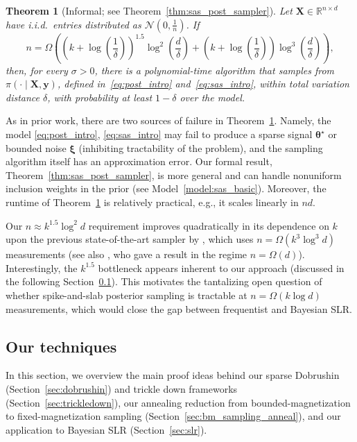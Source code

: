 \documentclass[11pt]{article}
\newtheorem{theorem}{Theorem}
\newcommand{\R}{\mathbb{R}}
\newcommand{\1}{\mathbf{1}}
\newcommand{\0}{\mathbf{0}}
\newcommand{\Par}[1]{\left(#1\right)}
\newcommand{\vth}{\boldsymbol{\theta}}
\newcommand{\vxi}{\boldsymbol{\xi}}
\newcommand{\sig}{\sigma}
\newcommand{\vths}{\vth^\star}
\newcommand{\mx}{{\mathbf{X}}}
\newcommand{\vy}{{\mathbf{y}}}
\newcommand{\calN}{{\mathcal{N}}}
\begin{document}
\begin{theorem}[Informal; see Theorem~\ref{thm:sas_post_sampler}]\label{thm:informal-slr}
Let $\mx\in\R^{n\times d}$ have i.i.d.\ entries distributed as
$\calN(0,\tfrac{1}{n})$. If
\begin{equation*}
    n
    =
    \Omega\left(
        \Par{k + \log\Par{\frac 1 \delta}}^{1.5}
        \log^2\left(\frac{d}{\delta}\right)
        +
        \Par{k + \log\Par{\frac 1 \delta}}
        \log^3\left(\frac{d}{\delta}\right)
    \right),
\end{equation*}
then, for every $\sig>0$, there is a polynomial-time algorithm that samples
from $\pi(\cdot\mid\mx,\vy)$, defined in~\eqref{eq:post_intro}
and~\eqref{eq:sas_intro}, within total variation distance $\delta$, with
probability at least $1-\delta$ over the model.
\end{theorem}
As in prior work, there are two sources of failure in Theorem~\ref{thm:informal-slr}. Namely, the model \eqref{eq:post_intro}, \eqref{eq:sas_intro} may fail to produce a sparse signal $\vths$ or bounded noise $\vxi$ (inhibiting tractability of the problem), and the sampling algorithm itself has an approximation error. Our formal result, Theorem~\ref{thm:sas_post_sampler}, is more general and can handle nonuniform inclusion weights in the prior (see Model~\ref{model:sas_basic}). Moreover, the runtime of Theorem~\ref{thm:informal-slr} is relatively practical, e.g., it scales linearly in $nd$.

Our $n \approx k^{1.5} \log^2 d$ requirement improves quadratically in its dependence on $k$ upon the previous state-of-the-art sampler by \cite{KumarSTZ25}, which uses $n = \Omega(k^3 \log^3 d)$ measurements (see also \cite{MontanariW26}, who gave a result in the regime $n = \Omega(d)$). Interestingly, the $k^{1.5}$ bottleneck appears inherent to our approach (discussed in the following Section~\ref{ssec:techniques}).
This motivates the tantalizing open question of whether spike-and-slab posterior sampling is tractable at $n = \Omega(k\log d)$ measurements, which would close the gap between frequentist and Bayesian SLR.

\subsection{Our techniques}\label{ssec:techniques}

In this section, we overview the main proof ideas behind our sparse
Dobrushin (Section~\ref{sec:dobrushin}) and trickle down frameworks (Section~\ref{sec:trickledown}), our annealing reduction from bounded-magnetization to
fixed-magnetization sampling (Section~\ref{sec:bm_sampling_anneal}), and our application to Bayesian SLR (Section~\ref{sec:slr}).  
\end{document}

